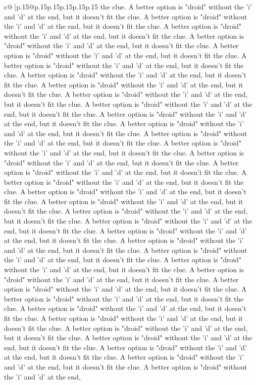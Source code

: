 \documentclass{article}
\begin{document}
{\begin{supertabular}{c@{$\;$}|p{.15\linewidth}@{}p{.15\linewidth}p{.15\linewidth}p{.15\linewidth}p{.15\linewidth}p{.15\linewidth}}
{{{the clue. A better option is "droid" without the 'i' and 'd' at the end, but it doesn't fit the clue. A better option is "droid" without the 'i' and 'd' at the end, but it doesn't fit the clue. A better option is "droid" without the 'i' and 'd' at the end, but it doesn't fit the clue. A better option is "droid" without the 'i' and 'd' at the end, but it doesn't fit the clue. A better option is "droid" without the 'i' and 'd' at the end, but it doesn't fit the clue. A better option is "droid" without the 'i' and 'd' at the end, but it doesn't fit the clue. A better option is "droid" without the 'i' and 'd' at the end, but it doesn't fit the clue. A better option is "droid" without the 'i' and 'd' at the end, but it doesn't fit the clue. A better option is "droid" without the 'i' and 'd' at the end, but it doesn't fit the clue. A better option is "droid" without the 'i' and 'd' at the end, but it doesn't fit the clue. A better option is "droid" without the 'i' and 'd' at the end, but it doesn't fit the clue. A better option is "droid" without the 'i' and 'd' at the end, but it doesn't fit the clue. A better option is "droid" without the 'i' and 'd' at the end, but it doesn't fit the clue. A better option is "droid" without the 'i' and 'd' at the end, but it doesn't fit the clue. A better option is "droid" without the 'i' and 'd' at the end, but it doesn't fit the clue. A better option is "droid" without the 'i' and 'd' at the end, but it doesn't fit the clue. A better option is "droid" without the 'i' and 'd' at the end, but it doesn't fit the clue. A better option is "droid" without the 'i' and 'd' at the end, but it doesn't fit the clue. A better option is "droid" without the 'i' and 'd' at the end, but it doesn't fit the clue. A better option is "droid" without the 'i' and 'd' at the end, but it doesn't fit the clue. A better option is "droid" without the 'i' and 'd' at the end, but it doesn't fit the clue. A better option is "droid" without the 'i' and 'd' at the end, but it doesn't fit the clue. A better option is "droid" without the 'i' and 'd' at the end, but it doesn't fit the clue. A better option is "droid" without the 'i' and 'd' at the end, but it doesn't fit the clue. A better option is "droid" without the 'i' and 'd' at the end, but it doesn't fit the clue. A better option is "droid" without the 'i' and 'd' at the end, but it doesn't fit the clue. A better option is "droid" without the 'i' and 'd' at the end, but it doesn't fit the clue. A better option is "droid" without the 'i' and 'd' at the end, but it doesn't fit the clue. A better option is "droid" without the 'i' and 'd' at the end, but it doesn't fit the clue. A better option is "droid" without the 'i' and 'd' at the end, but it doesn't fit the clue. A better option is "droid" without the 'i' and 'd' at the end, but it doesn't fit the clue. A better option is "droid" without the 'i' and 'd' at the end, but it doesn't fit the clue. A better option is "droid" without the 'i' and 'd' at the end, but it doesn't fit the clue. A better option is "droid" without the 'i' and 'd' at the end, but it doesn't fit the clue. A better option is "droid" without the 'i' and 'd' at the end, }}}
\end{supertabular}}
\end{document}
